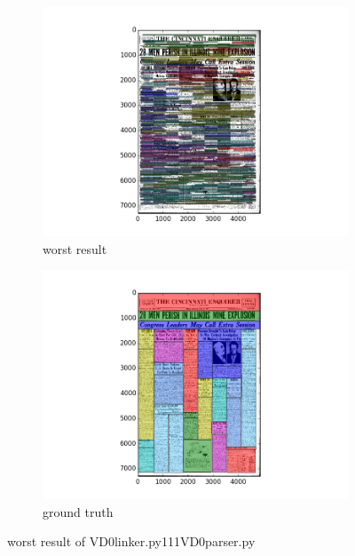 \documentclass[a4paper,10pt]{article}
\begin{document}
					\begin{figure}
					\centering
					\begin{subfigure}{.5\textwidth}
					  \centering
					  \includegraphics[width=10cm]
					{VD0linker.py111VD0parser.py.worst.png}
					  \caption{worst result}
					  \label{fig:sub1}
					\end{subfigure}%
					\begin{subfigure}{.5\textwidth}
					  \centering
					  \includegraphics[width=10cm]
					{VD0linker.py111VD0parser.py.gt.worst.png}
					  \caption{ground truth}
					  \label{fig:sub2}
					\end{subfigure}
					\caption
					{worst result of VD0linker.py111VD0parser.py}
					\label{fig:test}
					\end{figure}
					
\end{document}
